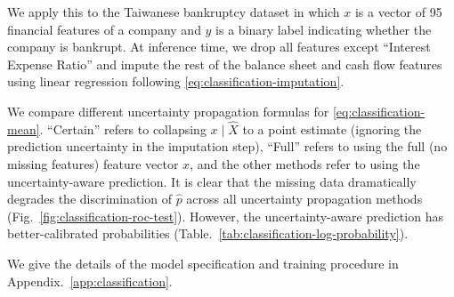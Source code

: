 \documentclass{article}
\begin{document}
We apply this to the Taiwanese bankruptcy dataset \citep{liang_financial_2016,unknown_taiwanese_2020} in which \(x\) is a vector of 95 financial features of a company and \(y\) is a binary label indicating whether the company is bankrupt.
At inference time, we drop all features except ``Interest Expense Ratio'' and impute the rest of the balance sheet and cash flow features using linear regression following \eqref{eq:classification-imputation}.

We compare different uncertainty propagation formulas for \eqref{eq:classification-mean}.
``Certain'' refers to collapsing \(x \mid \hat X\) to a point estimate (ignoring the prediction uncertainty in the imputation step), ``Full'' refers to using the full (no missing features) feature vector \(x\), and the other methods refer to using the uncertainty-aware prediction.
It is clear that the missing data dramatically degrades the discrimination of \(\hat p\) across all uncertainty propagation methods (Fig.~\ref{fig:classification-roc-test}).
However, the uncertainty-aware prediction has better-calibrated probabilities (Table.~\ref{tab:classification-log-probability}).


We give the details of the model specification and training procedure in Appendix.~\ref{app:classification}.
\end{document}
